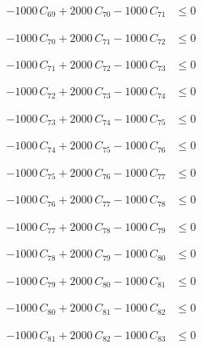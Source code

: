 \documentclass[a4paper,11pt]{article}
\begin{document}
\begin{align}
-1000\,C_{69} + 2000\,C_{70} - 1000\,C_{71} &\leq 0 \nonumber
\end{align}

\begin{align}
-1000\,C_{70} + 2000\,C_{71} - 1000\,C_{72} &\leq 0 \nonumber
\end{align}

\begin{align}
-1000\,C_{71} + 2000\,C_{72} - 1000\,C_{73} &\leq 0 \nonumber
\end{align}

\begin{align}
-1000\,C_{72} + 2000\,C_{73} - 1000\,C_{74} &\leq 0 \nonumber
\end{align}

\begin{align}
-1000\,C_{73} + 2000\,C_{74} - 1000\,C_{75} &\leq 0 \nonumber
\end{align}

\begin{align}
-1000\,C_{74} + 2000\,C_{75} - 1000\,C_{76} &\leq 0 \nonumber
\end{align}

\begin{align}
-1000\,C_{75} + 2000\,C_{76} - 1000\,C_{77} &\leq 0 \nonumber
\end{align}

\begin{align}
-1000\,C_{76} + 2000\,C_{77} - 1000\,C_{78} &\leq 0 \nonumber
\end{align}

\begin{align}
-1000\,C_{77} + 2000\,C_{78} - 1000\,C_{79} &\leq 0 \nonumber
\end{align}

\begin{align}
-1000\,C_{78} + 2000\,C_{79} - 1000\,C_{80} &\leq 0 \nonumber
\end{align}

\begin{align}
-1000\,C_{79} + 2000\,C_{80} - 1000\,C_{81} &\leq 0 \nonumber
\end{align}

\begin{align}
-1000\,C_{80} + 2000\,C_{81} - 1000\,C_{82} &\leq 0 \nonumber
\end{align}

\begin{align}
-1000\,C_{81} + 2000\,C_{82} - 1000\,C_{83} &\leq 0 \nonumber
\end{align}
\end{document}
